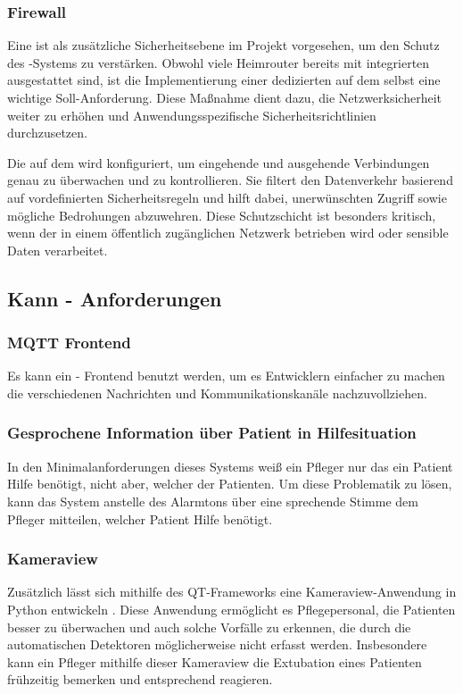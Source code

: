 \subsubsection{Firewall}
Eine  ist als zusätzliche Sicherheitsebene im Projekt vorgesehen, um den Schutz des -Systems zu verstärken. Obwohl viele Heimrouter bereits mit integrierten  ausgestattet sind, ist die Implementierung einer dedizierten  auf dem  selbst eine wichtige Soll-Anforderung. Diese Maßnahme dient dazu, die Netzwerksicherheit weiter zu erhöhen und Anwendungsspezifische Sicherheitsrichtlinien durchzusetzen.

Die  auf dem  wird konfiguriert, um eingehende und ausgehende Verbindungen genau zu überwachen und zu kontrollieren. Sie filtert den Datenverkehr basierend auf vordefinierten Sicherheitsregeln und hilft dabei, unerwünschten Zugriff sowie mögliche Bedrohungen abzuwehren. Diese Schutzschicht ist besonders kritisch, wenn der  in einem öffentlich zugänglichen Netzwerk betrieben wird oder sensible Daten verarbeitet.


\subsection{Kann - Anforderungen}

\subsubsection{MQTT Frontend}
Es kann ein  - Frontend benutzt werden, um es Entwicklern einfacher zu machen die verschiedenen Nachrichten und Kommunikationskanäle nachzuvollziehen. 

\subsubsection{Gesprochene Information über Patient in Hilfesituation}
In den Minimalanforderungen dieses Systems weiß ein Pfleger nur das ein Patient Hilfe benötigt, nicht aber, welcher der Patienten. Um diese Problematik zu lösen, kann das System anstelle des Alarmtons über eine sprechende Stimme dem Pfleger mitteilen, welcher Patient Hilfe benötigt. 

\subsubsection{Kameraview}
Zusätzlich lässt sich mithilfe des QT-Frameworks eine Kameraview-Anwendung in Python entwickeln \cite{Python} \cite{QT}. Diese Anwendung ermöglicht es Pflegepersonal, die Patienten besser zu überwachen und auch solche Vorfälle zu erkennen, die durch die automatischen Detektoren möglicherweise nicht erfasst werden. Insbesondere kann ein Pfleger mithilfe dieser Kameraview die Extubation eines Patienten frühzeitig bemerken und entsprechend reagieren.